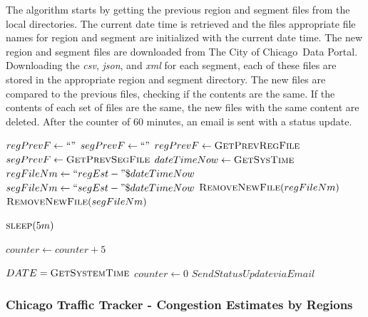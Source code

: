 \documentclass[titlepage,twocolumn]{article}
\newcommand{\CityChicago}{City of Chicago}
\begin{document}
\par The algorithm starts by getting the previous region and segment files from the local directories. The current date time is retrieved and the files appropriate file names for region and segment are initialized with the current date time. The new region and segment files are downloaded from The \CityChicago\ Data Portal. Downloading the \textit{csv}, \textit{json}, and \textit{xml} for each segment, each of these files are stored in the appropriate region and segment directory. The new files are compared to the previous files, checking if the contents are the same. If the contents of each set of files are the same, the new files with the same content are deleted. After the counter of 60 minutes, an email is sent with a status update. 

\begin{algorithm}
	\small
	\caption{\small Automated Download from The \CityChicago\ Data Portal}
	\label{alg:1}
	\begin{algorithmic}[1]
		\State $regPrevF \gets ``"$
		\State $segPrevF \gets ``"$
		\State $regPrevF \gets \Call{GetPrevRegFile}{}$
		\State $segPrevF \gets \Call{GetPrevSegFile}{}$
		\State $dateTimeNow \gets \Call{GetSysTime}{}$
		\State $regFileNm \gets ``regEst-"\$dateTimeNow$
		\State $segFileNm \gets ``segEst-"\$dateTimeNow$
		\State {}
		\State $\Call{RemoveNewFile}{regFileNm}$
		\EndIf
		\State $\Call{RemoveNewFile}{segFileNm}$
		\EndIf
		
		\State $\Call{sleep}{5m}$
		
		\State $counter \gets counter + 5$
		
		\State $DATE = \Call{GetSystemTime}{}$
		\State $counter \gets 0$
		\State $Send Status Update via Email$
		\EndIf
		
		\EndWhile
		
		\EndProcedure
	\end{algorithmic}
\end{algorithm}

\subsubsection{Chicago Traffic Tracker - Congestion Estimates by Regions}
\end{document}
